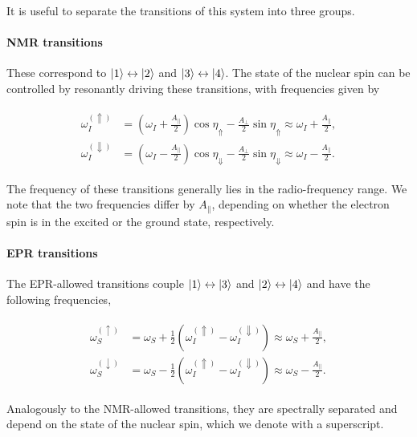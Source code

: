 It is useful to separate the transitions of this system into three groups.

\paragraph{NMR transitions} These correspond to $\ket{1}\leftrightarrow\ket{2}$ and $\ket{3}\leftrightarrow\ket{4}$. The state of the nuclear spin can be controlled by resonantly driving these transitions, with frequencies given by

\begin{align}
\begin{split}   
     \omega_I^{(\Uparrow)} &= \left(\omega_I + \frac{A_\parallel}{2}\right) \cos \eta_\Uparrow - \frac{A_\perp}{2} \sin \eta_\Uparrow \approx \omega_I + \frac{A_\parallel}{2}, \\ 
    \omega_I^{(\Downarrow)} &= \left(\omega_I - \frac{A_\parallel}{2}\right) \cos \eta_\Downarrow - \frac{A_\perp}{2} \sin \eta_\Downarrow \approx \omega_I - \frac{A_\parallel}{2}.
\end{split}    
\end{align}

The frequency of these transitions generally lies in the radio-frequency range. We note that the two frequencies differ by $A_\parallel$, depending on whether the electron spin is in the excited or the ground state, respectively.

\paragraph{EPR transitions} The EPR-allowed transitions couple $\ket{1} \leftrightarrow \ket{3}$ and $\ket{2} \leftrightarrow \ket{4}$ and have the following frequencies,

\begin{align}
\begin{split}  
    \omega_S^{(\uparrow)} &= \omega_S + \frac{1}{2} \left( \omega_I^{(\Uparrow)} - \omega_I^{(\Downarrow)} \right) \approx \omega_S + \frac{A_\parallel}{2}, \\ 
    \omega_S^{(\downarrow)}  &= \omega_S - \frac{1}{2} \left( \omega_I^{(\Uparrow)} - \omega_I^{(\Downarrow)} \right) \approx \omega_S - \frac{A_\parallel}{2}.
\end{split}    
\end{align}

Analogously to the NMR-allowed transitions, they are spectrally separated and depend on the state of the nuclear spin, which we denote with a superscript.

